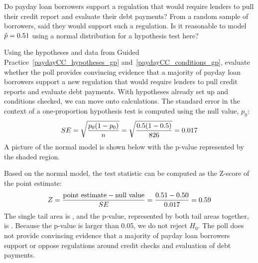 \D{\newpage}

\begin{exercisewrap}
\begin{nexercise}
\label{paydayCC_conditions_gp}%
Do payday loan borrowers support a regulation
that would
require lenders to pull their credit report
and evaluate their debt payments?
From a random sample of \paydayN{} borrowers,
\paydayCCPerc{} said they would support such
a regulation.
Is it reasonable to model $\hat{p} = 0.51{}$
using a normal distribution
for a hypothesis test here?\footnotemark
\end{nexercise}
\end{exercisewrap}
    
\begin{examplewrap}
\begin{nexample}{Using the hypotheses and data from
    Guided Practice~\ref{paydayCC_hypotheses_gp}
    and~\ref{paydayCC_conditions_gp},
    evaluate whether the poll provides convincing evidence
    that a majority of payday loan borrowers support
    a new regulation that would
    require lenders to pull credit reports
    and evaluate debt payments.}
  With hypotheses already set up and conditions checked,
  we can move onto calculations.
  The standard error in the context of a one-proportion
  hypothesis test is computed using the null value, $p_0$:
  \begin{align*}
  SE = \sqrt{\frac{p_0 (1 - p_0)}{n}}
      = \sqrt{\frac{0.5 (1 - 0.5)}{826{}}}
      = 0.017{}
  \end{align*}
  A picture of the normal model is shown below
  with the p-value represented by the shaded region.
  \begin{center}
  \end{center}
  Based on the normal model, the test statistic can be
  computed as the Z-score of the point estimate:
  \begin{align*}
  Z = \frac{\text{point estimate} - \text{null value}}{SE}
      = \frac{0.51{} - 0.50}{0.017{}}
      = 0.59{}
  \end{align*}
  The single tail area is \paydayCCOneTail{}, and the p-value,
  represented by both tail areas together, is \paydayCCPvalue{}.
  Because the p-value is larger than 0.05,
  we do not reject $H_0$.
  The poll does not provide convincing evidence that
  a majority of payday loan borrowers support or oppose
  regulations around credit checks and evaluation of
  debt payments.
\end{nexample}
\end{examplewrap}

